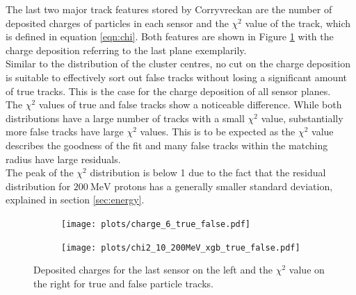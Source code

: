 The last two major track features stored by Corryvreckan are the number of deposited charges of particles in each sensor and the $\chi^2$ value of the track,
which is defined in equation \ref{eqn:chi}.
Both features are shown in Figure \ref{fig:charge_chi} with the charge deposition referring to the last plane exemplarily. \\
Similar to the distribution of the cluster centres, no cut on the charge deposition is suitable to effectively sort out false tracks without losing a significant
amount of true tracks. This is the case for the charge deposition of all sensor planes. \\
The $\chi^2$ values of true and false tracks show a noticeable difference. While both distributions have a large number of tracks
with a small $\chi^2$ value, substantially more false tracks have large $\chi^2$ values. This is to be expected as the $\chi^2$ value describes the goodness of the fit and
many false tracks within the matching radius have large residuals. \\
The peak of the $\chi^2$ distribution is below 1 due to the fact that the residual distribution
for $\SI{200}{\mega\eV}$ protons has a generally smaller standard deviation, explained in section \ref{sec:energy}.

\begin{figure}
  \hspace{-0.4cm}
  \begin{subfigure}{0.51\textwidth}
      \centering
      \texttt{[image: plots/charge\_6\_true\_false.pdf]}
  \end{subfigure}
  \begin{subfigure}{0.51\textwidth}
      \hspace{-0.11cm}
      \texttt{[image: plots/chi2\_10\_200MeV\_xgb\_true\_false.pdf]}
  \end{subfigure}
  \caption{Deposited charges for the last sensor on the left and the $\chi^2$ value on the right for true and false particle tracks.}
  \label{fig:charge_chi}
\end{figure}



